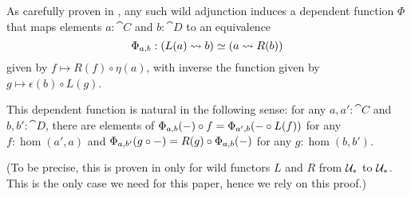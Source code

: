 \documentclass[english,a4paper]{lmcs}
\def\githubpath{\tt\small}
\begin{document}
\begin{rem} \label{def:wild-adj}
  As carefully proven in \cite[\githubpath
  theorems/homotopy/PtdAdjoint.agda]{hott-agda}, any such wild adjunction
  induces a dependent function $\Phi$ that maps elements $a:\cat C$ and $b:\cat
  D$ to an equivalence
  \begin{displaymath}
    \Phi_{a,b} : (\hom(L(a),b)) \weq (\hom(a,R(b)))
  \end{displaymath}
  given by $f \mapsto R(f) \circ \eta(a)$, with inverse the function given by
  $g\mapsto \epsilon(b) \circ L(g)$.

  This dependent function is natural in the following sense: for any $a,a':\cat
  C$ and $b,b':\cat D$, there are elements of $\Phi_{a,b}(\mathord{{-}}) \circ f =
  \Phi_{a',b} (\mathord{{-}} \circ L(f))$ for any $f:\hom(a',a)$ and
  $\Phi_{a,b'}(g\circ\mathord{{-}}) = R(g)\circ \Phi_{a,b} (\mathord{{-}})$ for any
  $g:\hom(b,b')$.

  (To be precise, this is proven in \cite{hott-agda} only for wild functors $L$
  and $R$ from $\mathcal{U}_*$ to $\mathcal{U}_*$. This is the only case we need for this
paper, hence we rely on this proof.)
\end{rem}
\end{document}
